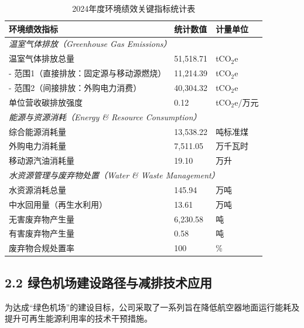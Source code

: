 \documentclass[a4paper,12pt]{article}
\begin{document}
\begin{table}[H]
    \centering
    \caption{2024年度环境绩效关键指标统计表}
    \label{tab:env_kpi}
    \renewcommand{\arraystretch}{1.3}
    \begin{tabular}{p{9cm} p{3cm} p{3cm}}
        \toprule
        \textbf{环境绩效指标} & \textbf{统计数值} & \textbf{计量单位} \\
        \midrule
        \multicolumn{3}{l}{\textit{温室气体排放（Greenhouse Gas Emissions）}} \\
        温室气体排放总量 & 51,518.71 & tCO$_2$e \\
        \quad - 范围1（直接排放：固定源与移动源燃烧） & 11,214.39 & tCO$_2$e \\
        \quad - 范围2（间接排放：外购电力消费） & 40,304.32 & tCO$_2$e \\
        单位营收碳排放强度 & 0.12 & tCO$_2$e/万元 \\
        \midrule
        \multicolumn{3}{l}{\textit{能源与资源消耗（Energy \& Resource Consumption）}} \\
        综合能源消耗量 & 13,538.22 & 吨标准煤 \\
        外购电力消耗量 & 7,511.05 & 万千瓦时 \\
        移动源汽油消耗量 & 19.10 & 万升 \\
        \midrule
        \multicolumn{3}{l}{\textit{水资源管理与废弃物处置（Water \& Waste Management）}} \\
        水资源消耗总量 & 145.94 & 万吨 \\
        中水回用量（再生水利用） & 13.61 & 万吨 \\
        无害废弃物产生量 & 6,230.58 & 吨 \\
        有害废弃物产生量 & 0.58 & 吨 \\
        废弃物合规处置率 & 100 & \% \\
        \bottomrule
    \end{tabular}
\end{table}

\subsection{2.2 绿色机场建设路径与减排技术应用}

为达成“绿色机场”的建设目标，公司采取了一系列旨在降低航空器地面运行能耗及提升可再生能源利用率的技术干预措施。
\end{document}
